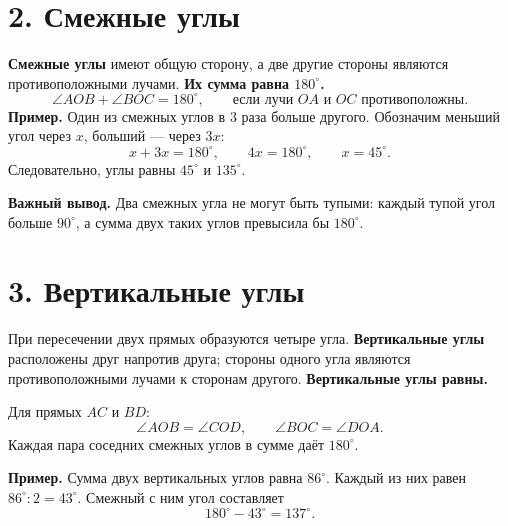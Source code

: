 \documentclass[a4paper,12pt]{article}
\newcommand{\headingrule}{\vspace{-0.45em}{\color{accent}\hrule height 0.55pt}\vspace{0.55em}}
\newcommand{\key}[1]{\textbf{\color{darkaccent}#1}}
\begin{document}
\section*{2. Смежные углы}
\headingrule
\key{Смежные углы} имеют общую сторону, а две другие стороны являются противоположными лучами. \key{Их сумма равна $180^\circ$.}
\[
\angle AOB+\angle BOC=180^\circ,
\qquad \text{если лучи }OA\text{ и }OC\text{ противоположны.}
\]
\textbf{Пример.} Один из смежных углов в $3$ раза больше другого.
Обозначим меньший угол через $x$, больший --- через $3x$:
\[
x+3x=180^\circ,\qquad 4x=180^\circ,\qquad x=45^\circ.
\]
Следовательно, углы равны $45^\circ$ и $135^\circ$.

\key{Важный вывод.} Два смежных угла не могут быть тупыми: каждый тупой угол больше $90^\circ$, а сумма двух таких углов превысила бы $180^\circ$.

\clearpage
\section*{3. Вертикальные углы}
\headingrule
При пересечении двух прямых образуются четыре угла.
\key{Вертикальные углы} расположены друг напротив друга; стороны одного угла являются противоположными лучами к сторонам другого. \key{Вертикальные углы равны.}

\begin{center}
\end{center}
Для прямых $AC$ и $BD$:
\[
\angle AOB=\angle COD,\qquad
\angle BOC=\angle DOA.
\]
Каждая пара соседних смежных углов в сумме даёт $180^\circ$.

\textbf{Пример.} Сумма двух вертикальных углов равна $86^\circ$.
Каждый из них равен $86^\circ:2=43^\circ$.
Смежный с ним угол составляет
\[
180^\circ-43^\circ=137^\circ.
\]
\end{document}
